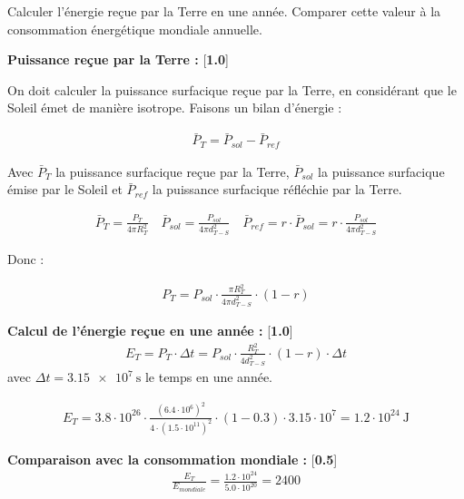 \documentclass[twoside,a4paper,11pt,addpoints]{exam}%
\begin{document}
\begin{questions}
\question[2\half] Calculer l'énergie reçue par la Terre en une année. Comparer cette valeur à la consommation énergétique mondiale annuelle.

\begin{mybox}
   \begin{solution}[10cm]
      \textbf{Puissance reçue par la Terre :} [\textbf{1.0}]

      On doit calculer la puissance surfacique reçue par la Terre, en considérant que le Soleil émet de manière isotrope. Faisons un bilan d'énergie :  

      \begin{align*}
         \bar{P}_T = \bar{P}_{sol} - \bar{P}_{ref}
      \end{align*}

      Avec $\bar{P}_T$ la puissance surfacique reçue par la Terre, $\bar{P}_{sol}$ la puissance surfacique émise par le Soleil et $\bar{P}_{ref}$ la puissance surfacique réfléchie par la Terre.

      \begin{align*}
         \bar{P}_T = \frac{P_T}{4 \pi R_T^2} \quad 
         \bar{P}_{sol} = \frac{P_{sol}}{4 \pi d_{T-S}^2} \quad
         \bar{P}_{ref} = r \cdot \bar{P}_{sol} = r \cdot \frac{P_{sol}}{4 \pi d_{T-S}^2}
      \end{align*}

      Donc : 

      \begin{align*}
         P_{T} = P_{sol} \cdot \frac{\pi R_T^2}{4 \pi d_{T-S}^2} \cdot (1-r)
      \end{align*}

      \textbf{Calcul de l'énergie reçue en une année :} [\textbf{1.0}]
      \begin{align*}
         E_T = P_T \cdot \Delta t = P_{sol} \cdot \frac{R_T^2}{4 d_{T-S}^2} \cdot (1-r) \cdot \Delta t
      \end{align*}
      avec $\Delta t = \SI{3.15e7}{\second}$ le temps en une année.
      
      \begin{align*}
         E_T = 3.8 \cdot 10^{26} \cdot \frac{(6.4 \cdot 10^6)^2}{4 \cdot (1.5 \cdot 10^{11})^2} \cdot (1-0.3) \cdot 3.15 \cdot 10^7 = 1.2 \cdot 10^{24} ~ \si{\joule}
      \end{align*}

      \textbf{Comparaison avec la consommation mondiale :} [\textbf{0.5}]
      \begin{align*}
         \frac{E_T}{E_{mondiale}} = \frac{1.2 \cdot 10^{24}}{5.0 \cdot 10^{20}} = 2400
      \end{align*}
      

\end{solution}
\end{mybox}
\end{questions}
\end{document}
